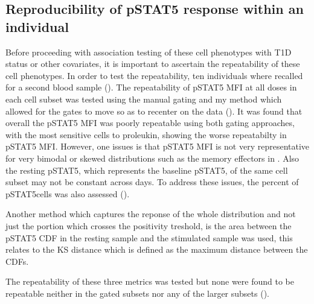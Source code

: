 \subsection{Reproducibility of pSTAT5 response within an individual}

Before proceeding with association testing of these cell phenotypes with T1D status or other covariates,
it is important to ascertain the repeatability of these cell phenotypes.
In order to test the repeatability, ten individuals where recalled for a second blood sample ().
The repeatability of pSTAT5 MFI at all doses in each cell subset was tested using the manual gating and my method which allowed for
the gates to move so as to recenter on the data ().
It was found that overall the pSTAT5 MFI was poorly repeatable using both gating approaches,
with the most sensitive cells to proleukin, showing the worse repeatabilty in pSTAT5 MFI.
However, one issues is that pSTAT5 MFI is not very representative for very bimodal or skewed distributions such
as the memory effectors in .
Also the resting pSTAT5, which represents the baseline pSTAT5, of the same cell subset may not be constant across days.  
To address these issues, the percent of pSTAT5\positive cells was also assessed ().

Another method which captures the reponse of the whole distribution and not just the portion which crosses the positivity treshold,
is the area between the pSTAT5 CDF in the resting sample and the stimulated sample was used,
this relates to the KS distance which is defined as the maximum distance between the CDFs.


The repeatability of these three metrics was tested but none were found to be repeatable neither in the gated subsets nor any of the larger subsets ().



